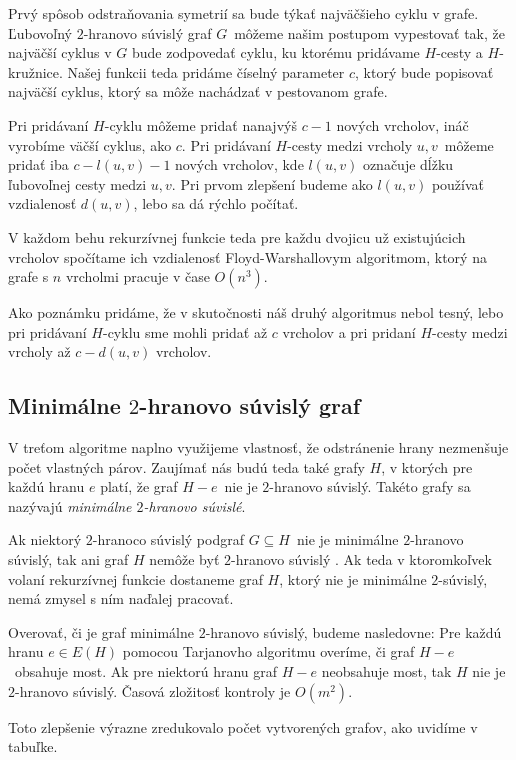 Prvý spôsob odstraňovania symetrií sa bude týkať najväčšieho cyklu v grafe. Ľubovoľný $2$-hranovo
súvislý graf $G$ môžeme našim postupom vypestovať tak, že najväčší cyklus v $G$ bude zodpovedať
cyklu, ku ktorému pridávame $H$-cesty a $H$-kružnice. Našej funkcii teda pridáme číselný parameter
$c$, ktorý bude popisovať najväčší cyklus, ktorý sa môže nachádzať v pestovanom grafe.

Pri pridávaní $H$-cyklu môžeme pridať nanajvýš $c - 1$ nových vrcholov, ináč vyrobíme väčší
cyklus, ako $c$. Pri pridávaní $H$-cesty medzi vrcholy $u, v$ môžeme pridať iba $c - l(u,v) - 1$ nových
vrcholov, kde $l(u,v)$ označuje dĺžku ľubovoľnej cesty medzi $u, v$. Pri prvom zlepšení budeme
ako $l(u,v)$ používať vzdialenosť $d(u,v)$, lebo sa dá rýchlo počítať.

V každom behu rekurzívnej funkcie teda pre každu dvojicu už existujúcich vrcholov spočítame
ich vzdialenosť Floyd-Warshallovym algoritmom, ktorý na grafe s $n$ vrcholmi pracuje v čase
$O(n^3)$.

Ako poznámku pridáme, že v skutočnosti náš druhý algoritmus nebol tesný, lebo pri pridávaní $H$-cyklu
sme mohli pridať až $c$ vrcholov a pri pridaní $H$-cesty medzi vrcholy až $c - d(u,v)$ vrcholov.

\subsection{Minimálne $2$-hranovo súvislý graf}

V treťom algoritme naplno využijeme vlastnosť, že odstránenie hrany nezmenšuje počet vlastných
párov. Zaujímať nás budú teda také grafy $H$, v ktorých pre každú hranu $e$ platí, že graf $H - e$ nie je $2$-hranovo
súvislý. Takéto grafy sa nazývajú \emph{minimálne $2$-hranovo súvislé}.

Ak niektorý $2$-hranoco súvislý podgraf $G \subseteq H$ nie je minimálne $2$-hranovo súvislý,
tak ani graf $H$ nemôže byť $2$-hranovo súvislý \cite{min2con}. Ak teda v ktoromkoľvek volaní
rekurzívnej funkcie dostaneme graf $H$, ktorý nie je minimálne $2$-súvislý, nemá zmysel s ním
naďalej pracovať.

Overovať, či je graf minimálne $2$-hranovo súvislý, budeme nasledovne: Pre každú hranu $e \in E(H)$
pomocou Tarjanovho algoritmu overíme, či graf $H - e$ obsahuje most. Ak pre niektorú hranu graf $H - e$
neobsahuje most, tak $H$ nie je $2$-hranovo súvislý. Časová zložitosť kontroly je $O(m^2)$.

Toto zlepšenie výrazne zredukovalo počet vytvorených grafov, ako uvidíme v tabuľke.

